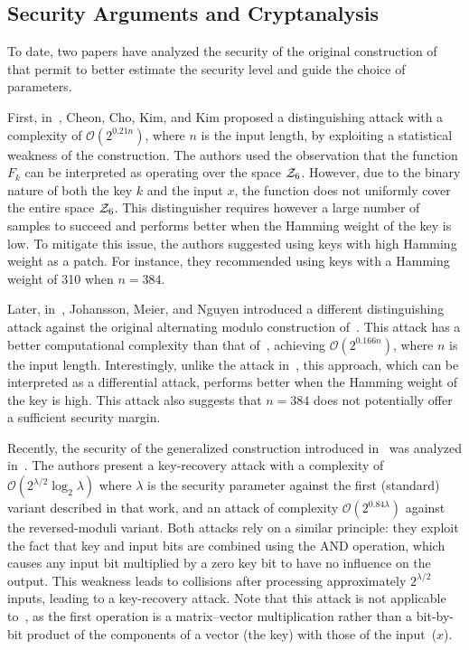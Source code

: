 \subsection{Security Arguments and Cryptanalysis}
\label{sec:bipsw_cryptanalysis}

To date, two papers have analyzed the security of the original construction of~\cite{TCC:BIPSW18} that permit to better estimate the security level and guide the  choice of parameters.

First, in~\cite{PKC:CCKK21}, Cheon, Cho, Kim, and Kim proposed a distinguishing attack with a complexity of $\mathcal{O}(2^{0.21n})$, where $n$ is the input length, by exploiting a statistical weakness of the construction. The authors used the observation that the function $F_k$ can be interpreted as operating over the space $\mathcal{Z}_6$. However, due to the binary nature of both the key $k$ and the input $x$, the function does not uniformly cover the entire space $\mathcal{Z}_6$. This distinguisher requires however a large number of samples to succeed and performs better when the Hamming weight of the key is low. To mitigate this issue, the authors suggested using keys with high Hamming weight as a patch. For instance, they recommended using keys with a Hamming weight of 310 when $n = 384$.

Later, in~\cite{JMN23}, Johansson, Meier, and Nguyen introduced a different distinguishing attack against the original alternating modulo construction of~\cite{TCC:BIPSW18}. This attack has a better computational complexity than that of~\cite{PKC:CCKK21}, achieving $\mathcal{O}(2^{0.166n})$, where $n$ is the input length. Interestingly, unlike the attack in~\cite{PKC:CCKK21}, this approach, which can be interpreted as a differential attack, performs better when the Hamming weight of the key is high. This attack also suggests that $n = 384$ does not potentially offer a sufficient security margin.

Recently, the security of the generalized construction introduced in~\cite{C:APRR24} was analyzed in~\cite{ToSC:AR25}. The authors present a key-recovery attack with a complexity of $\mathcal{O}(2^{\lambda/2} \log_2 \lambda)$ where $\lambda$ is the security parameter against the first (standard) variant described in that work, and an attack of complexity $\mathcal{O}(2^{0.84\lambda})$ against the reversed-moduli variant. Both attacks rely on a similar principle: they exploit the fact that key and input bits are combined using the AND operation, which causes any input bit multiplied by a zero key bit to have no influence on the output. This weakness leads to collisions after processing approximately $2^{\lambda/2}$ inputs, leading to a key-recovery attack. Note that this attack is not applicable to~\cite{C:DGHIKS21}, as the first operation is a matrix–vector multiplication rather than a bit-by-bit product of the components of a vector (the key) with those of the input~($x$). 



